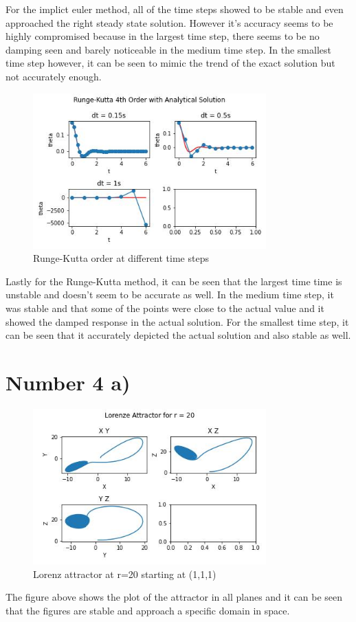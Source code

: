 \documentclass{article}
\begin{document}
		For the implict euler method, all of the time steps showed to be stable and even approached the right steady state solution. However it's accuracy seems to be highly compromised because in the largest time step, there seems to be no damping seen and barely noticeable in the medium time step. In the smallest time step however, it can be seen to mimic the trend of the exact solution but not accurately enough.
		\begin{figure}[H]
			\centering
			\includegraphics[width=0.8\textwidth]{images/rk43b.jpg}
			\caption{\label{} Runge-Kutta  order at different time steps}
		\end{figure}
		Lastly for the Runge-Kutta method, it can be seen that the largest time time is unstable and doesn't seem to be accurate as well. In the medium time step, it was stable and that some of the points were close to the actual value and it showed the damped response in the actual solution. For the smallest time step, it can be seen that it accurately depicted the actual solution and also stable as well. 
	\section*{Number 4 a)}
		\begin{figure}[H]
			\centering
			\includegraphics[width=0.8\textwidth]{images/rk44a.jpg}
			\caption{\label{} Lorenz attractor at r=20 starting at (1,1,1) }
		\end{figure}
		The figure above shows the plot of the attractor in all planes and it can be seen that the figures are stable and approach a specific domain in space.
\end{document}
